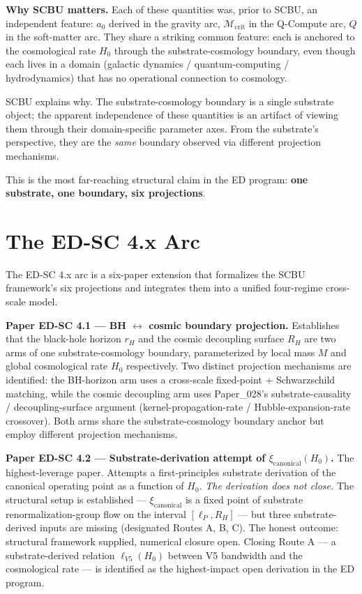 \documentclass[11pt,a4paper]{article}
\begin{document}
\textbf{Why SCBU matters.} Each of these quantities was, prior to SCBU, an independent feature: $a_0$ derived in the gravity arc, $\mathcal{M}_\mathrm{crit}$ in the Q-Compute arc, $Q$ in the soft-matter arc. They share a striking common feature: each is anchored to the cosmological rate $H_0$ through the substrate-cosmology boundary, even though each lives in a domain (galactic dynamics / quantum-computing / hydrodynamics) that has no operational connection to cosmology.

SCBU explains why. The substrate-cosmology boundary is a single substrate object; the apparent independence of these quantities is an artifact of viewing them through their domain-specific parameter axes. From the substrate's perspective, they are the \emph{same} boundary observed via different projection mechanisms.

This is the most far-reaching structural claim in the ED program: \textbf{one substrate, one boundary, six projections}.

\section{The ED-SC 4.x Arc}

The ED-SC 4.x arc is a six-paper extension that formalizes the SCBU framework's six projections and integrates them into a unified four-regime cross-scale model.

\textbf{Paper ED-SC 4.1 --- BH $\leftrightarrow$ cosmic boundary projection.} Establishes that the black-hole horizon $r_H$ and the cosmic decoupling surface $R_H$ are two arms of one substrate-cosmology boundary, parameterized by local mass $M$ and global cosmological rate $H_0$ respectively. Two distinct projection mechanisms are identified: the BH-horizon arm uses a cross-scale fixed-point + Schwarzschild matching, while the cosmic decoupling arm uses Paper\_028's substrate-causality / decoupling-surface argument (kernel-propagation-rate / Hubble-expansion-rate crossover). Both arms share the substrate-cosmology boundary anchor but employ different projection mechanisms.

\textbf{Paper ED-SC 4.2 --- Substrate-derivation attempt of $\xi_\mathrm{canonical}(H_0)$.} The highest-leverage paper. Attempts a first-principles substrate derivation of the canonical operating point as a function of $H_0$. \emph{The derivation does not close.} The structural setup is established --- $\xi_\mathrm{canonical}$ is a fixed point of substrate renormalization-group flow on the interval $[\ell_P, R_H]$ --- but three substrate-derived inputs are missing (designated Routes A, B, C). The honest outcome: structural framework supplied, numerical closure open. Closing Route A --- a substrate-derived relation $\ell_{V5}(H_0)$ between V5 bandwidth and the cosmological rate --- is identified as the highest-impact open derivation in the ED program.
\end{document}
